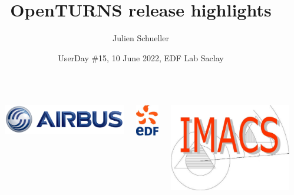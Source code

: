 \documentclass[aspectratio=169]{beamer}
\title[OpenTURNS]{OpenTURNS release highlights}
\author[OpenTURNS et al.]{Julien Schueller}
\date[]{UserDay \#15, 10 June 2022, EDF Lab Saclay}
\begin{document}

  \begin{frame}
  \titlepage

  \begin{columns}
  \begin{column}[t]{0.05\textwidth}
        \end{column}
  
  \begin{center}
\includegraphics[height=0.04\textheight]{figures/airbus-logo-3d-blue.png}
\end{center}

  \begin{center}
\includegraphics[height=0.09\textheight]{figures/logo-edf.jpg}
\end{center}

  \begin{center}
\includegraphics[height=0.09\textheight]{figures/imacs-logo.jpg}
\end{center}


\end{columns}
\end{frame}
\end{document}
